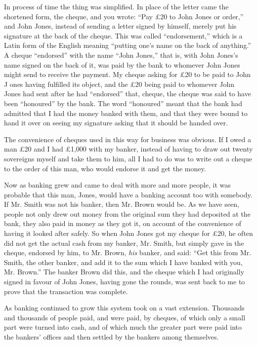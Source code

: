 \documentclass{book}
\begin{document}
In process of time the thing was simplified. In place of the letter came the shortened form, the cheque, and you wrote: “Pay £20 to John Jones or order,” and John Jones, instead of sending a letter signed by himself, merely put his signature at the back of the cheque. This was called “endorsement,” which is a Latin form of the English meaning “putting one’s name on the back of anything.” A cheque “endorsed” with the name “John Jones,” that is, with John Jones’s name signed on the back of it, was paid by the bank to whomever John Jones might send to receive the payment. My cheque asking for £20 to be paid to John J ones having fulfilled its object, and the £20 being paid to whomever John Jones had sent after he had “endorsed” that, cheque, the cheque was said to have been “honoured” by the bank. The word “honoured” meant that the bank had admitted that I had the money banked with them, and that they were bound to hand it over on seeing my signature asking that it should be handed over.

The convenience of cheques used in this way for business was obvious. If I owed a man £20 and I had £1,000 with my banker, instead of having to draw out twenty sovereigns myself and take them to him, all I had to do was to write out a cheque to the order of this man, who would endorse it and get the money.

Now as banking grew and came to deal with more and more people, it was probable that this man, Jones, would have a banking account too with somebody. If Mr. Smith was not his banker, then Mr. Brown would be. As we have seen, people not only drew out money from the original sum they had deposited at the bank, they also paid in money as they got it, on account of the convenience of having it looked after safely. So when John Jones got my cheque for £20, he often did not get the actual cash from my banker, Mr. Smith, but simply gave in the cheque, endorsed by him, to Mr. Brown, \emph{his} banker, and said: “Get this from Mr. Smith, the other banker, and add it to the sum which I have banked with you, Mr. Brown.” The banker Brown did this, and the cheque which I had originally signed in favour of John Jones, having gone the rounds, was sent back to me to prove that the transaction was complete.

As banking continued to grow this system took on a vast extension. Thousands and thousands of people paid, and were paid, by cheques, of which only a small part were turned into cash, and of which much the greater part were paid into the bankers’ offices and then settled by the bankers among themselves.
\end{document}
